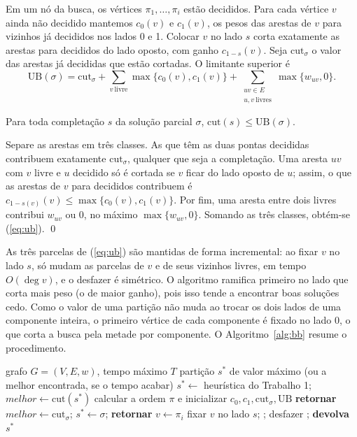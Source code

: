 Em um nó da busca, os vértices $\pi_1,\dots,\pi_{i}$ estão decididos. Para cada vértice $v$ ainda não decidido mantemos $c_0(v)$ e $c_1(v)$, os pesos das arestas de $v$ para vizinhos já decididos nos lados 0 e 1. Colocar $v$ no lado $s$ corta exatamente as arestas para decididos do lado oposto, com ganho $c_{1-s}(v)$. Seja $\mathrm{cut}_\sigma$ o valor das arestas já decididas que estão cortadas. O limitante superior é
\begin{equation}\label{eq:ub}
  \mathrm{UB}(\sigma)=\mathrm{cut}_\sigma+\sum_{v\ \text{livre}}\max\{c_0(v),c_1(v)\}+\sum_{\substack{uv\in E\\ u,v\ \text{livres}}}\max\{w_{uv},0\}.
\end{equation}

\begin{lema}\label{lema:ub}
Para toda completação $s$ da solução parcial $\sigma$, $\mathrm{cut}(s)\le \mathrm{UB}(\sigma)$.
\end{lema}
\begin{prova}
Separe as arestas em três classes. As que têm as duas pontas decididas contribuem exatamente $\mathrm{cut}_\sigma$, qualquer que seja a completação. Uma aresta $uv$ com $v$ livre e $u$ decidido só é cortada se $v$ ficar do lado oposto de $u$; assim, o que as arestas de $v$ para decididos contribuem é $c_{1-s(v)}(v)\le\max\{c_0(v),c_1(v)\}$. Por fim, uma aresta entre dois livres contribui $w_{uv}$ ou $0$, no máximo $\max\{w_{uv},0\}$. Somando as três classes, obtém-se (\ref{eq:ub}). \qed
\end{prova}

As três parcelas de (\ref{eq:ub}) são mantidas de forma incremental: ao fixar $v$ no lado $s$, só mudam as parcelas de $v$ e de seus vizinhos livres, em tempo $O(\deg v)$, e o desfazer é simétrico. O algoritmo ramifica primeiro no lado que corta mais peso (o de maior ganho), pois isso tende a encontrar boas soluções cedo. Como o valor de uma partição não muda ao trocar os dois lados de uma componente inteira, o primeiro vértice de cada componente é fixado no lado 0, o que corta a busca pela metade por componente. O Algoritmo~\ref{alg:bb} resume o procedimento.

\begin{algorithm}[ht]
\caption{Branch-and-Bound}\label{alg:bb}
\begin{algorithmic}[1]
\Require grafo $G=(V,E,w)$, tempo máximo $T$
\Ensure partição $s^*$ de valor máximo (ou a melhor encontrada, se o tempo acabar)
\State $s^*\gets$ heurística do Trabalho 1; \quad $\mathit{melhor}\gets \mathrm{cut}(s^*)$
\State calcular a ordem $\pi$ e inicializar $c_0,c_1,\mathrm{cut}_\sigma,\mathrm{UB}$
   \State \textbf{retornar} 
  \EndIf
   \State $\mathit{melhor}\gets \mathrm{cut}_\sigma$; \quad $s^*\gets\sigma$; \quad \textbf{retornar}
  \EndIf
  \State $v\gets\pi_i$
    \State fixar $v$ no lado $s$; \quad {}; \quad desfazer
  \EndFor
\EndProcedure
\State {}; \quad \textbf{devolva} $s^*$
\end{algorithmic}
\end{algorithm}

